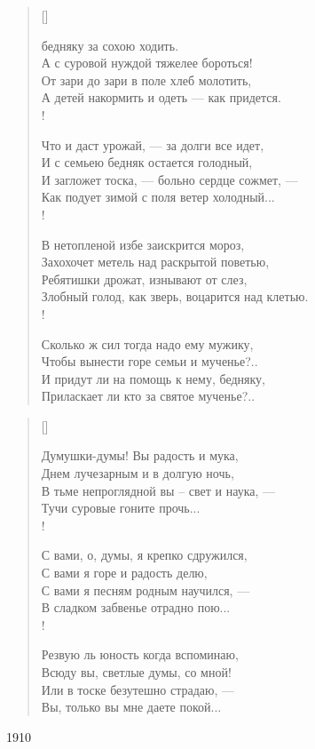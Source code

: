 \settowidth{\versewidth}{А с суровой нуждой тяжелее бороться!}
\begin{verse}[\versewidth]
\begin{patverse*}
 бедняку за сохою ходить.\\
А с суровой нуждой тяжелее бороться!\\
От зари до зари в поле хлеб молотить,\\
А детей накормить и одеть --- как придется.\\!

Что и даст урожай, --- за долги все идет,\\
И с семьею бедняк остается голодный,\\
И загложет тоска, --- больно сердце сожмет, ---\\
Как подует зимой с поля ветер холодный...\\!

В нетопленой избе заискрится мороз,\\
Захохочет метель над раскрытой поветью,\\
Ребятишки дрожат, изнывают от слез,\\
Злобный голод, как зверь, воцарится над клетью.\\!

Сколько ж сил тогда надо ему мужику,\\
Чтобы вынести горе семьи и мученье?..\\
И придут ли на помощь к нему, бедняку,\\
Приласкает ли кто за святое мученье?..
\end{patverse*}
\end{verse}


\settowidth{\versewidth}{Думушки – думы! Вы радость и мука,}
\begin{verse}[\versewidth]
\begin{altverse}
Думушки-думы! Вы радость и мука,\\
Днем лучезарным и в долгую ночь,\\
В тьме непроглядной вы – свет и наука, ---\\
Тучи суровые гоните прочь...\\!

С вами, о, думы, я крепко сдружился,\\
С вами я горе и радость делю,\\
С вами я песням родным научился, ---\\
В сладком забвенье отрадно пою...\\!

Резвую ль юность когда вспоминаю,\\
Всюду вы, светлые думы, со мной!\\
Или в тоске безутешно страдаю, ---\\
Вы, только вы мне даете покой...
\end{altverse}
\end{verse}
1910


